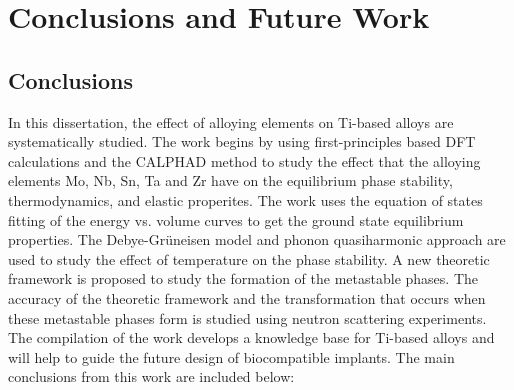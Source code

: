\chapter{Conclusions and Future Work}

\section{Conclusions}

In this dissertation, the effect of alloying elements on Ti-based alloys are systematically studied. The work begins by using first-principles based DFT calculations and the CALPHAD method to study the effect that the alloying elements Mo, Nb, Sn, Ta and Zr have on the equilibrium phase stability, thermodynamics, and elastic properites. The work uses the equation of states fitting of the energy vs. volume curves to get the ground state equilibrium properties. The Debye-Gr\"uneisen model and phonon quasiharmonic approach are used to study the effect of temperature on the phase stability. A new theoretic framework is proposed to study the formation of the metastable phases. The accuracy of the theoretic framework and the transformation that occurs when these metastable phases form is studied using neutron scattering experiments. The compilation of the work develops a knowledge base for Ti-based alloys and will help to guide the future design of biocompatible implants. The main conclusions from this work are included below:

